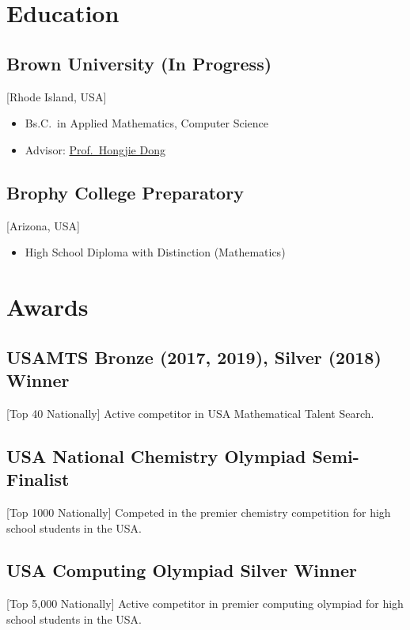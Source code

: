 \documentclass{mycv}
\begin{document}
\section{Education}

\subsection{Brown University (In Progress)}[Rhode Island, USA]
\vspace{-\parskip}%
\begin{itemize}[label={}]
  \item Bs.C.\ in Applied Mathematics, Computer Science 
  \item Advisor: \href{https://www.dam.brown.edu/people/hdong/}{Prof.~Hongjie Dong}
\end{itemize}

\subsection{Brophy College Preparatory}[Arizona, USA]
\vspace{-\parskip}%
\begin{itemize}[label={}]
  \item High School Diploma with Distinction (Mathematics) 
\end{itemize}

\section{Awards}
\subsection{USAMTS Bronze (2017, 2019), Silver (2018) Winner}[Top 40 Nationally]
Active competitor in USA Mathematical Talent Search.

\subsection{USA National Chemistry Olympiad Semi-Finalist}[Top 1000 Nationally]
Competed in the premier chemistry competition for high school students in the USA.

\subsection{USA Computing Olympiad Silver Winner}[Top 5,000 Nationally]
Active competitor in premier computing olympiad for high school students in the USA. 
\end{document}
